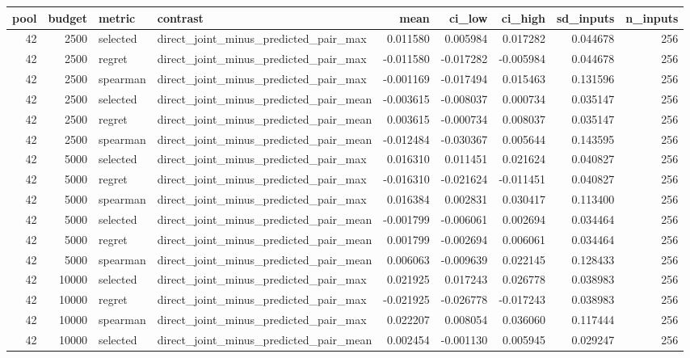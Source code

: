 \begin{tabular}{rrllrrrrr}
\toprule
pool & budget & metric & contrast & mean & ci_low & ci_high & sd_inputs & n_inputs \\
\midrule
42 & 2500 & selected & direct_joint_minus_predicted_pair_max & 0.011580 & 0.005984 & 0.017282 & 0.044678 & 256 \\
42 & 2500 & regret & direct_joint_minus_predicted_pair_max & -0.011580 & -0.017282 & -0.005984 & 0.044678 & 256 \\
42 & 2500 & spearman & direct_joint_minus_predicted_pair_max & -0.001169 & -0.017494 & 0.015463 & 0.131596 & 256 \\
42 & 2500 & selected & direct_joint_minus_predicted_pair_mean & -0.003615 & -0.008037 & 0.000734 & 0.035147 & 256 \\
42 & 2500 & regret & direct_joint_minus_predicted_pair_mean & 0.003615 & -0.000734 & 0.008037 & 0.035147 & 256 \\
42 & 2500 & spearman & direct_joint_minus_predicted_pair_mean & -0.012484 & -0.030367 & 0.005644 & 0.143595 & 256 \\
42 & 5000 & selected & direct_joint_minus_predicted_pair_max & 0.016310 & 0.011451 & 0.021624 & 0.040827 & 256 \\
42 & 5000 & regret & direct_joint_minus_predicted_pair_max & -0.016310 & -0.021624 & -0.011451 & 0.040827 & 256 \\
42 & 5000 & spearman & direct_joint_minus_predicted_pair_max & 0.016384 & 0.002831 & 0.030417 & 0.113400 & 256 \\
42 & 5000 & selected & direct_joint_minus_predicted_pair_mean & -0.001799 & -0.006061 & 0.002694 & 0.034464 & 256 \\
42 & 5000 & regret & direct_joint_minus_predicted_pair_mean & 0.001799 & -0.002694 & 0.006061 & 0.034464 & 256 \\
42 & 5000 & spearman & direct_joint_minus_predicted_pair_mean & 0.006063 & -0.009639 & 0.022145 & 0.128433 & 256 \\
42 & 10000 & selected & direct_joint_minus_predicted_pair_max & 0.021925 & 0.017243 & 0.026778 & 0.038983 & 256 \\
42 & 10000 & regret & direct_joint_minus_predicted_pair_max & -0.021925 & -0.026778 & -0.017243 & 0.038983 & 256 \\
42 & 10000 & spearman & direct_joint_minus_predicted_pair_max & 0.022207 & 0.008054 & 0.036060 & 0.117444 & 256 \\
42 & 10000 & selected & direct_joint_minus_predicted_pair_mean & 0.002454 & -0.001130 & 0.005945 & 0.029247 & 256 \\

\end{tabular}
